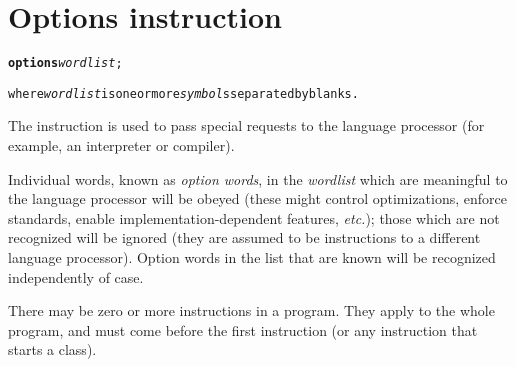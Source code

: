 \chapter{Options instruction}\label{refoptions}
\begin{shaded}
\begin{alltt}
\textbf{options} \emph{wordlist};

where \emph{wordlist} is one or more \emph{symbol}s separated by blanks.
\end{alltt}
\end{shaded}
 
The  instruction is used to pass special requests to
the language processor (for example, an interpreter or compiler).
 
Individual words, known as \emph{option words}, in the
\emph{wordlist} which are meaningful to the language processor will
be obeyed (these might control optimizations, enforce standards, enable
implementation-dependent features, \emph{etc.}); those which are not
recognized will be ignored (they are assumed to be instructions to a
different language processor).
Option words in the list that are known will be recognized independently
of case.
 
There may be zero or more  instructions in a program.
They apply to the whole program, and must come before the first
 instruction (or any instruction that starts a class).
 
